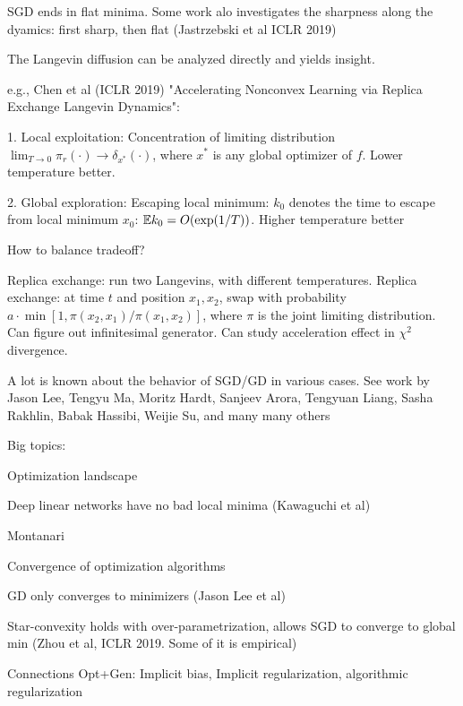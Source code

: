 \documentclass[english]{article}
\begin{document}
\item SGD ends in flat minima. Some work alo investigates the sharpness along the dyamics: first sharp, then flat (Jastrzebski et al ICLR 2019)

\item The Langevin diffusion can be analyzed directly and yields insight.

e.g., Chen et al (ICLR 2019) "Accelerating Nonconvex Learning via Replica Exchange Langevin Dynamics":

1. Local exploitation: Concentration of limiting distribution $\lim_{T\to0}\pi_r(\cdot)\to\delta_{x^*}(\cdot)$, where $x^*$ is any global optimizer of $f$. Lower temperature better.

2. Global exploration: Escaping local minimum: $k_0$ denotes the time to escape from local minimum $x_0$: $\mathbb{E} k_0 = O(\exp(1/T))$. Higher temperature better

How to balance tradeoff?

Replica exchange: run two Langevins, with different temperatures. Replica exchange: at time $t$ and position $x_1,x_2$, swap with probability $a\cdot \min [1, \pi(x_2,x_1)/\pi(x_1,x_2)]$, where $\pi$ is the joint limiting distribution. Can figure out infinitesimal generator. Can study acceleration effect in $\chi^2$ divergence.

\item A lot is known about the behavior of SGD/GD in various cases. See work by Jason Lee, Tengyu Ma, Moritz Hardt, Sanjeev Arora, Tengyuan Liang, Sasha Rakhlin, Babak Hassibi, Weijie Su, and many many others

Big topics: 

\benum 
\item 
Optimization landscape

Deep linear networks have no bad local minima (Kawaguchi et al)

Montanari

\item Convergence of optimization algorithms

GD only converges to minimizers (Jason Lee et al)

Star-convexity holds with over-parametrization, allows SGD to converge to global min (Zhou et al, ICLR 2019. Some of it is empirical) 


\item Connections Opt+Gen: Implicit bias, Implicit regularization, algorithmic regularization 

\eenum 
\end{document}
